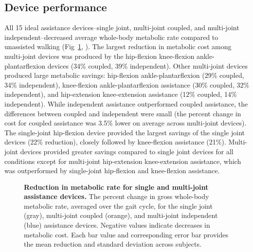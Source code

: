 \documentclass[10pt,letterpaper]{article}
\begin{document}
\subsection*{Device performance}
All 15 ideal assistance devices--single joint, multi-joint coupled, and multi-joint independent--decreased average whole-body metabolic rate compared to unassisted walking (Fig~\ref{Fig1}, ). The largest reduction in metabolic cost among multi-joint devices was produced by the hip-flexion knee-flexion ankle-plantarflexion devices (34\% coupled, 39\% independent). Other multi-joint devices produced large metabolic savings: hip-flexion ankle-plantarflexion (29\% coupled, 34\% independent), knee-flexion ankle-plantarflexion assistance (30\% coupled, 32\% independent), and hip-extension knee-extension assistance (12\% coupled, 14\% independent). While independent assistance outperformed coupled assistance, the differences between coupled and independent were small (the percent change in cost for coupled assistance was 3.5\% lower on average across multi-joint devices). The single-joint hip-flexion device provided the largest savings of the single joint devices (22\% reduction), closely followed by knee-flexion assistance (21\%). Multi-joint devices provided greater savings compared to single joint devices for all conditions except for multi-joint hip-extension knee-extension assistance, which was outperformed by single-joint hip-flexion and knee-flexion assistance. 

\begin{figure}[!h]
\begin{adjustwidth}{-1in}{0in} %
    \centering
    \caption{{\bf Reduction in metabolic rate for single and multi-joint assistance devices.}
        The percent change in gross whole-body metabolic rate, averaged over the gait cycle, for the single joint (gray), multi-joint coupled (orange), and multi-joint independent (blue) assistance devices. Negative values indicate decreases in metabolic cost. Each bar value and corresponding error bar provides the mean reduction and standard deviation across subjects.}
\label{Fig1}
\end{adjustwidth}
\end{figure} 
\end{document}
